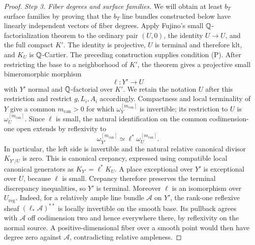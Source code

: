 \begin{proof}
\emph{Step 3. Fiber degrees and surface families.}
We will obtain at least \(b_T\) surface families by proving that the
\(b_T\) line bundles constructed below have linearly independent vectors
of fiber degrees.
Apply Fujino's small \(\mathbb{Q}\)-factorialization theorem
\cite[Theorem~1.24]{FujinoAnalyticMMP} to the ordinary pair
\((U,0)\), the identity \(U\to U\), and the full compact \(K'\).
The identity is projective, \(U\) is terminal and therefore klt,
and \(K_U\) is \(\mathbb{Q}\)-Cartier.  The preceding construction supplies
condition (P).  After restricting the base to a neighborhood of
\(K'\), the theorem gives a projective small bimeromorphic morphism
\[
 \ell:Y'\longrightarrow U
\]
with \(Y'\) normal and \(\mathbb{Q}\)-factorial over \(K'\).  We retain the
notation \(U\) after this restriction and restrict \(g,L_i,A_i\)
accordingly.  Compactness and local terminality of \(Y\) give a common
\(m_{\mathrm{can}}>0\) for which \(\omega_Y^{[m_{\mathrm{can}}]}\) is
invertible; its restriction to \(U\) is
\(\omega_U^{[m_{\mathrm{can}}]}\).  Since \(\ell\) is
small, the natural identification on the common codimension-one open
extends by reflexivity to
\[
 \omega_{Y'}^{[m_{\mathrm{can}}]}
 \simeq\ell^*\omega_U^{[m_{\mathrm{can}}]}.
\]
In particular, the left side is invertible and the natural relative
canonical divisor \(K_{Y'/U}\) is zero.  This is canonical crepancy,
expressed using compatible local canonical generators as
\(K_{Y'}=\ell^*K_U\).  A place exceptional over \(Y'\) is exceptional
over \(U\), because \(\ell\) is small.  Crepancy therefore preserves
the terminal discrepancy inequalities, so \(Y'\) is terminal.  Moreover \(\ell\)
is an isomorphism over \(U_{\mathrm{reg}}\).  Indeed, for a relatively
ample line bundle \(\mathcal A\) on \(Y'\), the rank-one reflexive
sheaf \((\ell_*\mathcal A)^{**}\) is locally invertible on the smooth
base.  Its pullback agrees with \(\mathcal A\) off codimension two
and hence everywhere there, by reflexivity on the normal source.
A positive-dimensional fiber over a smooth point would then have
degree zero against \(\mathcal A\), contradicting relative ampleness.


\end{proof}
